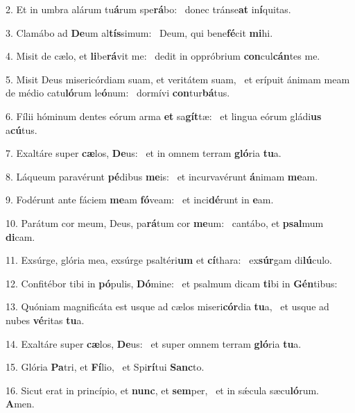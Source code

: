 2. Et in umbra alárum tu\textbf{á}rum spe\textbf{rá}bo: \ast\  donec tránse\textbf{at} in\textbf{í}quitas.\

3. Clamábo ad \textbf{De}um al\textbf{tís}simum: \ast\  Deum, qui bene\textbf{fé}cit \textbf{mi}hi.\

4. Misit de cælo, et \textbf{li}be\textbf{rá}vit me: \ast\  dedit in oppróbrium \textbf{con}cul\textbf{cán}tes me.\

5. Misit Deus misericórdiam suam, et veritátem suam, \dag\  et erípuit ánimam meam de médio catu\textbf{ló}rum le\textbf{ó}num: \ast\  dormívi \textbf{con}tur\textbf{bá}tus.\

6. Fílii hóminum dentes eórum arma \textbf{et} sa\textbf{gít}tæ: \ast\  et lingua eórum gládi\textbf{us} a\textbf{cú}tus.\

7. Exaltáre super \textbf{cæ}los, \textbf{De}us: \ast\  et in omnem terram \textbf{gló}ria \textbf{tu}a.\

8. Láqueum paravérunt \textbf{pé}dibus \textbf{me}is: \ast\  et incurvavérunt \textbf{á}nimam \textbf{me}am.\

9. Fodérunt ante fáciem \textbf{me}am \textbf{fó}veam: \ast\  et inci\textbf{dé}runt in \textbf{e}am.\

10. Parátum cor meum, Deus, pa\textbf{rá}tum cor \textbf{me}um: \ast\  cantábo, et \textbf{psal}mum \textbf{di}cam.\

11. Exsúrge, glória mea, exsúrge psaltéri\textbf{um} et \textbf{cí}thara: \ast\  ex\textbf{súr}gam di\textbf{lú}culo.\

12. Confitébor tibi in \textbf{pó}pulis, \textbf{Dó}mine: \ast\  et psalmum dicam \textbf{ti}bi in \textbf{Gén}tibus:\

13. Quóniam magnificáta est usque ad cælos miseri\textbf{cór}dia \textbf{tu}a, \ast\  et usque ad nubes \textbf{vé}ritas \textbf{tu}a.\

14. Exaltáre super \textbf{cæ}los, \textbf{De}us: \ast\  et super omnem terram \textbf{gló}ria \textbf{tu}a.\

15. Glória \textbf{Pa}tri, et \textbf{Fí}lio, \ast\  et Spi\textbf{rí}tui \textbf{Sanc}to.\

16. Sicut erat in princípio, et \textbf{nunc}, et \textbf{sem}per, \ast\  et in sǽcula sæcu\textbf{ló}rum. \textbf{A}men.\

